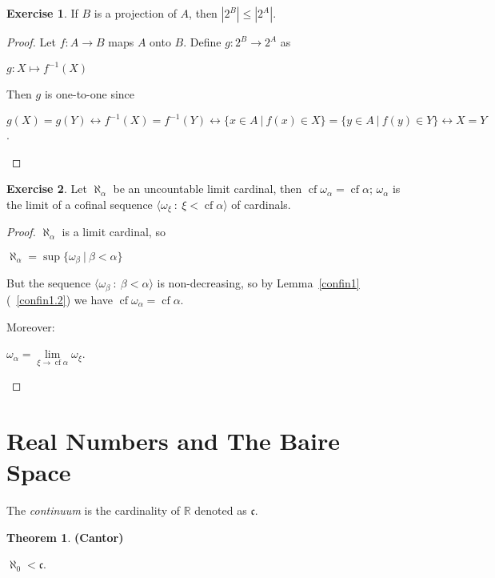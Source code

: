 \documentclass[8pt]{article}
\theoremstyle{definition}
\theoremstyle{definition}
\newtheorem{theorem}{Theorem}[section]
\theoremstyle{definition}
\theoremstyle{definition}
\theoremstyle{definition}
\theoremstyle{definition}
\theoremstyle{definition}
\theoremstyle{definition}
\theoremstyle{definition}
\theoremstyle{definition}
\theoremstyle{definition}
\theoremstyle{definition}
\theoremstyle{definition}
\newtheorem{exercise}{Exercise}[section]
\theoremstyle{definition}
\theoremstyle{question}
\begin{document}
\begin{exercise}
  If $B$ is a projection of $A$, then $|2^B| \leq |2^A|$.
\end{exercise}

\begin{proof}
  Let $f : A \to B$ maps $A$ onto $B$. Define $g : 2^{B} \to 2^A$ as
  \begin{center}
    $g : X \mapsto f^{-1}(X)$
  \end{center}
  Then $g$ is one-to-one since
  \begin{center}
  $g(X) = g(Y) \leftrightarrow f^{-1}(X) = f^{-1}(Y) \leftrightarrow 
  \{ x \in A \: | \: f(x) \in X \} = \{ y \in A \: | \: f(y) \in Y \} \leftrightarrow X = Y$.
  \end{center}
\end{proof}

\begin{exercise}
  Let $\aleph_{\alpha}$ be an uncountable limit cardinal, then 
  $\operatorname{cf} \omega_{\alpha} = \operatorname{cf} \alpha$; 
  $\omega_{\alpha}$ is the limit of a cofinal sequence $\langle \omega_{\xi} \: : \: \xi < \operatorname{cf} \alpha \rangle$ of cardinals.
\end{exercise}

\begin{proof}
  $\aleph_{\alpha}$ is a limit cardinal, so 
  \begin{center}
  $\aleph_{\alpha} = \sup \{ \omega_{\beta} \: | \: \beta < \alpha \}$
  \end{center}
  But the sequence $\langle \omega_{\beta} \: : \: \beta < \alpha \rangle$ is non-decreasing, so by Lemma~\ref{confin1}(~\ref{confin1.2})
  we have $\operatorname{cf} \omega_{\alpha} = \operatorname{cf} \alpha$.

  Moreover:
  \begin{center}
    $\omega_{\alpha} = \lim \limits_{\xi \to \operatorname{cf} \alpha} \omega_{\xi}$.
  \end{center}
\end{proof}

\section{Real Numbers and The Baire Space}

The \emph{continuum} is the cardinality of $\mathbb{R}$ denoted as $\mathfrak{c}$.

\begin{theorem} {\bf (Cantor)}

  $\aleph_0 < \mathfrak{c}$.
\end{theorem}
\end{document}

